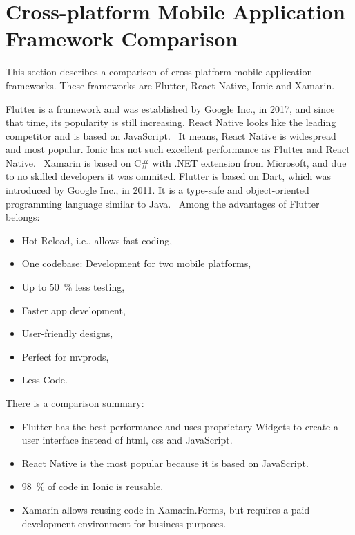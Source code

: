 \section{Cross-platform Mobile Application Framework Comparison}\label{sec:cross-platform-mobile-application-framework-comparison}
This section describes a comparison of cross-platform mobile application frameworks.
These frameworks are Flutter, React Native, Ionic and Xamarin.

Flutter is a framework and was established by Google Inc., in 2017, and since that time, its popularity is still increasing.
React Native looks like the leading competitor and is based on JavaScript.~\cite{flutterVsReactNativeNevercodeIo}
It means, React Native is widespread and most popular.
Ionic has not such excellent performance as Flutter and React Native.~\cite{crossPlatformFrameworokComparation}
Xamarin is based on C\# with .NET extension from Microsoft, and due to no skilled developers it was ommited.
Flutter is based on Dart, which was introduced by Google Inc., in 2011.
It is a type-safe and object-oriented programming language similar to Java.~\cite{dartTypeSystem}
\newline
\newline
Among the advantages of Flutter~\cite{flutterVsReactNativeHackrIo} belongs:
\begin{itemize}
    \item Hot Reload, i.e., allows fast coding,
    \item One codebase: Development for two mobile platforms,
    \item Up to 50~\% less testing,
    \item Faster app development,
    \item User-friendly designs,
    \item Perfect for \acrshort{mvprod}s,
    \item Less Code.
\end{itemize}
There is a comparison summary:
\begin{itemize}
    \item Flutter has the best performance and uses proprietary Widgets to create a user interface instead of \acrshort{html}, \acrshort{css} and JavaScript.
    \item React Native is the most popular because it is based on JavaScript.
    \item 98~\% of code in Ionic is reusable.
    \item Xamarin allows reusing code in Xamarin.Forms, but requires a paid development environment for business purposes.
\end{itemize}